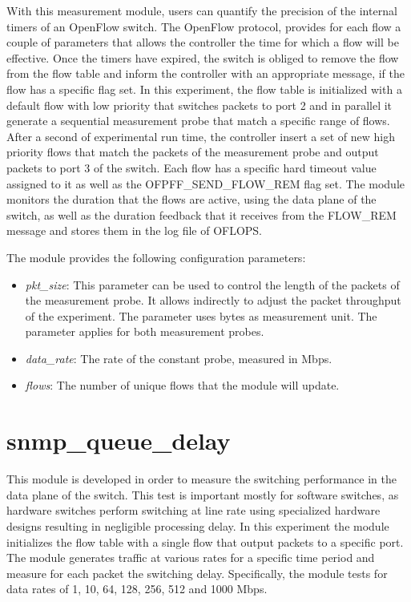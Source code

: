 \documentclass{book}
\begin{document}
With this measurement module, users can quantify the precision of the internal
timers of an OpenFlow switch. The OpenFlow protocol, provides for each flow a
couple of parameters that allows the controller the time for which a flow will be
effective. Once the timers have expired, the switch is obliged to remove the
flow from the flow table and inform the controller with an appropriate 
message, if the flow has a specific flag set. In this experiment, the flow table is
initialized with a default flow with low priority that switches packets to port
2 and in parallel it generate a sequential measurement probe that match a specific
range of flows. After a second of experimental run time, the controller insert a
set of new high priority flows that match the packets of the measurement probe 
and output packets to port 3 of the switch. Each flow has a specific hard timeout 
value assigned to it as well as the OFPFF\_SEND\_FLOW\_REM flag set. The module monitors 
the duration that the flows are active, using the data plane of the switch, as 
well as the duration feedback that it receives from the FLOW\_REM message and
stores them in the log file of OFLOPS. 

The module provides the following configuration parameters:
\begin{itemize}
    \item \emph{pkt\_size}: This parameter can be used to control the length of the
        packets of the measurement probe. It allows indirectly to adjust the packet
        throughput of the experiment. The parameter uses bytes as measurement unit.
        The parameter applies for both measurement probes.
    \item \emph{data\_rate}: The rate of the constant probe, measured in Mbps.
    \item \emph{flows}:  The number of unique flows that the module will
        update.
\end{itemize}

\section{snmp\_queue\_delay}

This module is developed in order to measure the switching performance in the
data plane of the switch. This test is important mostly for software
switches, as hardware switches perform switching at line rate using
specialized hardware designs resulting in negligible processing delay. 
In this experiment the module initializes the flow table with a single
flow that output packets to a specific port. The module generates traffic at
various rates for a specific time period and measure for each packet the switching delay. 
Specifically, the module tests for data rates of 1, 10, 64, 128, 256, 512 and 1000 Mbps.
\end{document}
